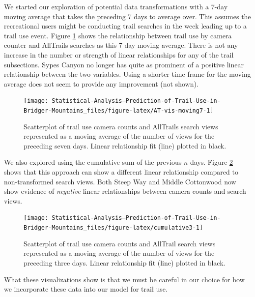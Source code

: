 \documentclass[
]{book}
\begin{document}
We started our exploration of potential data transformations with a 7-day moving average that takes the preceding 7 days to average over. This assumes the recreational users might be conducting trail searches in the week leading up to a trail use event. Figure \ref{fig:AT-vis-moving7} shows the relationship between trail use by camera counter and AllTrails searches as this 7 day moving average. There is not any increase in the number or strength of linear relationships for any of the trail subsections. Sypes Canyon no longer has quite as prominent of a positive linear relationship between the two variables. Using a shorter time frame for the moving average does not seem to provide any improvement (not shown).

\begin{figure}

{\centering \texttt{[image: Statistical-Analysis--Prediction-of-Trail-Use-in-Bridger-Mountains\_files/figure-latex/AT-vis-moving7-1]} 

}

\caption{Scatterplot of trail use camera counts and AllTrails search views represented as a moving average of the number of views for the preceding seven days. Linear relationship fit (line) plotted in black.}\label{fig:AT-vis-moving7}
\end{figure}

We also explored using the cumulative sum of the previous \(n\) days. Figure \ref{fig:cumulative3} shows that this approach can show a different linear relationship compared to non-transformed search views. Both Steep Way and Middle Cottonwood now show evidence of \emph{negative} linear relationships between camera counts and search views.

\begin{figure}

{\centering \texttt{[image: Statistical-Analysis--Prediction-of-Trail-Use-in-Bridger-Mountains\_files/figure-latex/cumulative3-1]} 

}

\caption{Scatterplot of trail use camera counts and AllTrail search views represented as a moving average of the number of views for the preceding three days. Linear relationship fit (line) plotted in black. }\label{fig:cumulative3}
\end{figure}

What these visualizations show is that we must be careful in our choice for how we incorporate these data into our model for trail use.
\end{document}
